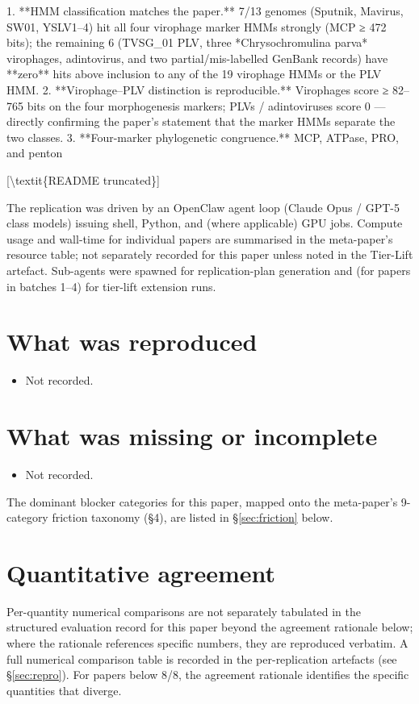 \documentclass[11pt]{article}
\begin{document}
1. **HMM classification matches the paper.** 7/13 genomes (Sputnik, Mavirus,
   SW01, YSLV1–4) hit all four virophage marker HMMs strongly (MCP ≥ 472 bits);
   the remaining 6 (TVSG\_01 PLV, three *Chrysochromulina parva* virophages,
   adintovirus, and two partial/mis-labelled GenBank records) have **zero**
   hits above inclusion to any of the 19 virophage HMMs or the PLV HMM.
2. **Virophage–PLV distinction is reproducible.** Virophages score
   ≥ 82–765 bits on the four morphogenesis markers; PLVs / adintoviruses
   score 0 — directly confirming the paper's statement that the marker
   HMMs separate the two classes.
3. **Four-marker phylogenetic congruence.** MCP, ATPase, PRO, and penton

[\textbackslash{}textit\{README truncated\}]
\normalsize

The replication was driven by an OpenClaw agent loop (Claude Opus / GPT-5 class models) issuing shell, Python, and (where applicable) GPU jobs. Compute usage and wall-time for individual papers are summarised in the meta-paper's resource table; not separately recorded for this paper unless noted in the Tier-Lift artefact. Sub-agents were spawned for replication-plan generation and (for papers in batches 1--4) for tier-lift extension runs.

\section{What was reproduced}
\begin{itemize}
\item Not recorded.
\end{itemize}

\section{What was missing or incomplete}
\begin{itemize}
\item Not recorded.
\end{itemize}
The dominant blocker categories for this paper, mapped onto the meta-paper's 9-category friction taxonomy (\S4), are listed in \S\ref{sec:friction} below.

\section{Quantitative agreement}
Per-quantity numerical comparisons are not separately tabulated in the structured evaluation record for this paper beyond the agreement rationale below; where the rationale references specific numbers, they are reproduced verbatim. A full numerical comparison table is recorded in the per-replication artefacts (see \S\ref{sec:repro}). For papers below 8/8, the agreement rationale identifies the specific quantities that diverge.
\end{document}
